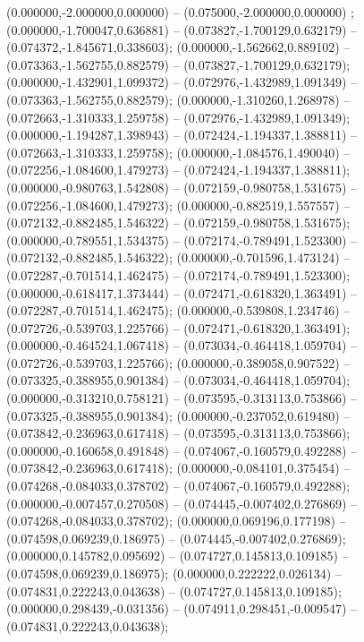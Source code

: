  (0.000000,-2.000000,0.000000) -- (0.075000,-2.000000,0.000000) ;
 (0.000000,-1.700047,0.636881) -- (0.073827,-1.700129,0.632179) -- (0.074372,-1.845671,0.338603);
 (0.000000,-1.562662,0.889102) -- (0.073363,-1.562755,0.882579) -- (0.073827,-1.700129,0.632179);
 (0.000000,-1.432901,1.099372) -- (0.072976,-1.432989,1.091349) -- (0.073363,-1.562755,0.882579);
 (0.000000,-1.310260,1.268978) -- (0.072663,-1.310333,1.259758) -- (0.072976,-1.432989,1.091349);
 (0.000000,-1.194287,1.398943) -- (0.072424,-1.194337,1.388811) -- (0.072663,-1.310333,1.259758);
 (0.000000,-1.084576,1.490040) -- (0.072256,-1.084600,1.479273) -- (0.072424,-1.194337,1.388811);
 (0.000000,-0.980763,1.542808) -- (0.072159,-0.980758,1.531675) -- (0.072256,-1.084600,1.479273);
 (0.000000,-0.882519,1.557557) -- (0.072132,-0.882485,1.546322) -- (0.072159,-0.980758,1.531675);
 (0.000000,-0.789551,1.534375) -- (0.072174,-0.789491,1.523300) -- (0.072132,-0.882485,1.546322);
 (0.000000,-0.701596,1.473124) -- (0.072287,-0.701514,1.462475) -- (0.072174,-0.789491,1.523300);
 (0.000000,-0.618417,1.373444) -- (0.072471,-0.618320,1.363491) -- (0.072287,-0.701514,1.462475);
 (0.000000,-0.539808,1.234746) -- (0.072726,-0.539703,1.225766) -- (0.072471,-0.618320,1.363491);
 (0.000000,-0.464524,1.067418) -- (0.073034,-0.464418,1.059704) -- (0.072726,-0.539703,1.225766);
 (0.000000,-0.389058,0.907522) -- (0.073325,-0.388955,0.901384) -- (0.073034,-0.464418,1.059704);
 (0.000000,-0.313210,0.758121) -- (0.073595,-0.313113,0.753866) -- (0.073325,-0.388955,0.901384);
 (0.000000,-0.237052,0.619480) -- (0.073842,-0.236963,0.617418) -- (0.073595,-0.313113,0.753866);
 (0.000000,-0.160658,0.491848) -- (0.074067,-0.160579,0.492288) -- (0.073842,-0.236963,0.617418);
 (0.000000,-0.084101,0.375454) -- (0.074268,-0.084033,0.378702) -- (0.074067,-0.160579,0.492288);
 (0.000000,-0.007457,0.270508) -- (0.074445,-0.007402,0.276869) -- (0.074268,-0.084033,0.378702);
 (0.000000,0.069196,0.177198) -- (0.074598,0.069239,0.186975) -- (0.074445,-0.007402,0.276869);
 (0.000000,0.145782,0.095692) -- (0.074727,0.145813,0.109185) -- (0.074598,0.069239,0.186975);
 (0.000000,0.222222,0.026134) -- (0.074831,0.222243,0.043638) -- (0.074727,0.145813,0.109185);
 (0.000000,0.298439,-0.031356) -- (0.074911,0.298451,-0.009547) -- (0.074831,0.222243,0.043638);
